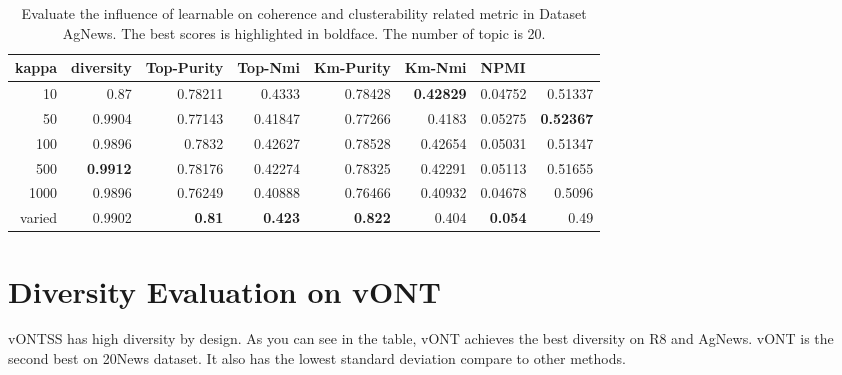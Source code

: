 \documentclass[11pt]{article}
\begin{document}
\begin{table}
\centering
\begin{tabular}{|r|r|r|r|r|r|r|r|}
\multicolumn{1}{l}{kappa} & \multicolumn{1}{l}{diversity} & \multicolumn{1}{l}{Top-Purity} & \multicolumn{1}{l}{Top-Nmi} & \multicolumn{1}{l}{Km-Purity} & \multicolumn{1}{l}{Km-Nmi} & \multicolumn{1}{l}{NPMI} & \multicolumn{1}{l}{}  \\ 
\hline
10                        & 0.87                          & 0.78211                    & 0.4333                  & 0.78428                       & \textbf{0.42829}                    & 0.04752                  & 0.51337                 \\ 
\hline
50                        & 0.9904                        & 0.77143                    & 0.41847                 & 0.77266                       & 0.4183                     & 0.05275                  & \textbf{0.52367}                 \\ 
\hline
100                       & 0.9896                        & 0.7832                     & 0.42627                 & 0.78528                       & 0.42654                    & 0.05031                  & 0.51347                 \\ 
\hline
500                       & \textbf{0.9912}                        & 0.78176                    & 0.42274                 & 0.78325                       & 0.42291                    & 0.05113                  & 0.51655                 \\ 
\hline
1000                      & 0.9896                        & 0.76249                    & 0.40888                 & 0.76466                       & 0.40932                    & 0.04678                  & 0.5096                  \\ 
\hline
varied                    & 0.9902                        & \textbf{0.81}                       & \textbf{0.423}                   & \textbf{0.822}                         & 0.404                      & \textbf{0.054}                    & 0.49                    \\
\hline
\end{tabular}

\caption{\label{kappa} Evaluate the influence of learnable on coherence and clusterability related metric in Dataset AgNews. The best scores is highlighted in boldface. The number of topic is 20.}

\end{table}


\section{Diversity Evaluation on vONT}
\label{diveristy}
vONTSS has high diversity by design. As you can see in the table, vONT achieves the best diversity on R8 and AgNews. vONT is the second best on 20News dataset. It also has the lowest standard deviation compare to other methods.
\end{document}
